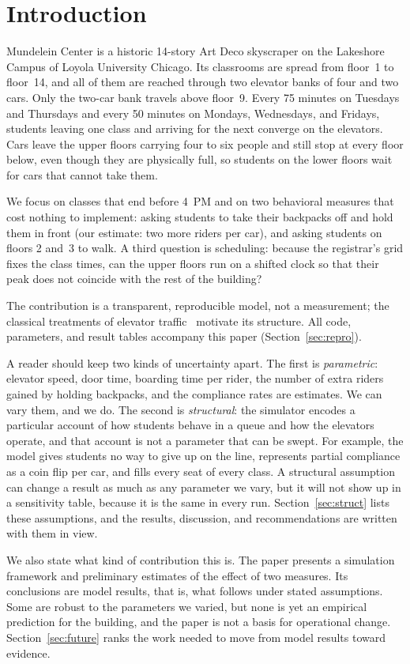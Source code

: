 \section{Introduction}

Mundelein Center is a historic 14-story Art Deco skyscraper on the Lakeshore Campus of Loyola University Chicago. Its classrooms are spread from floor~1 to floor~14, and
all of them are reached through two elevator banks of four and two cars. Only the two-car bank travels above
floor~9. Every 75 minutes on Tuesdays and Thursdays and every 50 minutes on Mondays, Wednesdays, and
Fridays, students leaving one class and arriving for the next converge on the elevators. Cars leave the upper
floors carrying four to six people and still stop at every floor below, even though they are physically full,
so students on the lower floors wait for cars that cannot take them.

We focus on classes that end before 4~PM and on two behavioral measures that cost nothing to implement: asking
students to take their backpacks off and hold them in front (our estimate: two more riders per car), and asking
students on floors 2 and~3 to walk. A third question is scheduling: because the registrar's grid fixes the
class times, can the upper floors run on a shifted clock so that their peak does not coincide with the rest of
the building?

The contribution is a transparent, reproducible model, not a measurement; the classical treatments of elevator traffic~\cite{barney,strakosch} motivate its structure. All code, parameters, and result
tables accompany this paper (Section~\ref{sec:repro}).

A reader should keep two kinds of uncertainty apart. The first is \emph{parametric}: elevator speed, door time,
boarding time per rider, the number of extra riders gained by holding backpacks, and the compliance rates are
estimates. We can vary them, and we do. The second is \emph{structural}: the simulator encodes a particular
account of how students behave in a queue and how the elevators operate, and that account is not a parameter that
can be swept. For example, the model gives students no way to give up on the line, represents partial compliance
as a coin flip per car, and fills every seat of every class. A structural assumption can change a result as much
as any parameter we vary, but it will not show up in a sensitivity table, because it is the same in every run.
Section~\ref{sec:struct} lists these assumptions, and the results, discussion, and recommendations are written
with them in view.

We also state what kind of contribution this is. The paper presents a simulation framework and preliminary
estimates of the effect of two measures. Its conclusions are model results, that is, what follows under stated
assumptions. Some are robust to the parameters we varied, but none is yet an empirical prediction for the building,
and the paper is not a basis for operational change. Section~\ref{sec:future} ranks the work needed to move from
model results toward evidence.
